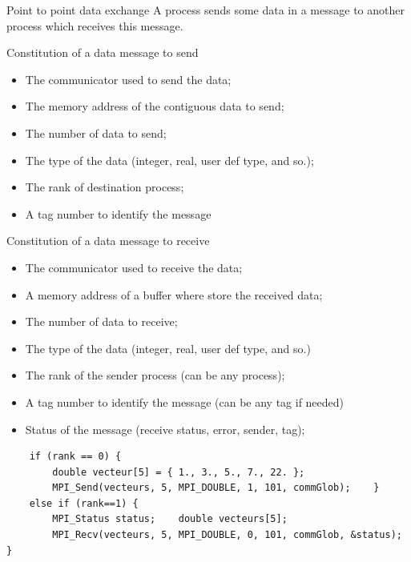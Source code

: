 \documentclass[compress,10pt,aspectratio=169]{beamer}
\begin{document}
\begin{frame}[fragile]{Point to point data exchange}
    \scriptsize
    A process sends some data in a message to another process which receives this message.
    \begin{multicols}{2}
    \begin{block}{\small Constitution of a data message to send}
        \begin{itemize}
            \item The communicator used to send the data;
            \item The memory address of the contiguous data to send;
            \item The number of data to send;
            \item The type of the data (integer, real, user def type, and so.);
            \item The rank of destination process;
            \item A tag number to identify the message
        \end{itemize}
    \end{block}
    \begin{block}{\small Constitution of a data message to receive}
        \begin{itemize}
            \item The communicator used to receive the data;
            \item A memory address of a buffer where store the received data;
            \item The number of data to receive;
            \item The type of the data (integer, real, user def type, and so.)
            \item The rank of the sender process (can be any process);
            \item A tag number to identify the message (can be any tag if needed)
            \item Status of the message (receive status, error, sender, tag);
        \end{itemize}
    \end{block}
\end{multicols}

\begin{verbatim}
    if (rank == 0) {
        double vecteur[5] = { 1., 3., 5., 7., 22. };
        MPI_Send(vecteurs, 5, MPI_DOUBLE, 1, 101, commGlob);    }
    else if (rank==1) {
        MPI_Status status;    double vecteurs[5];
        MPI_Recv(vecteurs, 5, MPI_DOUBLE, 0, 101, commGlob, &status);    }
\end{verbatim}

\end{frame}
\end{document}
